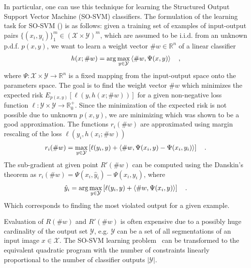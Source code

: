In particular, one can use this technique for learning the Structured Output Support Vector Machine (SO-SVM) classifiers. The formulation of the learning task for SO-SVM (\cite{Tsoch-StructOutput05}) is as follows: given a training set of examples of input-output pairs $\{ (x_i, y_i) \}_1^m \in (\mathcal{X} \times \mathcal{Y})^m$, which are assumed to be i.i.d. from an unknown p.d.f. $p(x, y)$, we want to learn a weight vector $\#w \in \mathbb{R}^n$ of a linear classifier
%
\begin{equation}
	h(x; \#w) = \arg\max_{y \in \mathcal{Y}} \left\langle \#w, \Psi(x, y)  \right\rangle \quad ,
\end{equation}
%
where $\Psi:\mathcal{X} \times \mathcal{Y} \rightarrow \mathbb{R}^n$ is a fixed mapping from the input-output space onto the parameters space. The goal is to find the weight vector $\#w$ which minimizes the expected risk $E_{p(x, y)}[\ell(y, h(x; \#w))]$ for a given non-negative loss function $\ell: \mathcal{Y} \times \mathcal{Y} \rightarrow \mathbb{R}_0^+$. Since the minimization of the expected risk is not possible due to unknown $p(x, y)$, we are minimizing  which was shown to be a good approximation. The functions $r_i(\#w)$ are approximated using margin rescaling of the loss $\ell(y_i, h(x_i; \#w))$
%
\begin{equation}
	r_i(\#w) = \max_{y \in \mathcal{Y}} \left[ \ell(y_i, y) + \langle \#w, \Psi(x_i, y) - \Psi(x_i, y_i)  \rangle  \right] \quad.
\end{equation}
%
The sub-gradient at given point $R'(\#w)$ can be computed using the Danskin's theorem as $r_i(\#w) = \Psi(x_i, \hat{y}_i) - \Psi(x_i, y_i)$, where
\begin{equation}
	\hat{y}_i = \arg\max_{y \in \mathcal{Y}} \left[ \ell(y_i, y) + \langle \#w, \Psi(x_i, y)  \rangle  \right]  \quad.
\end{equation}
%
Which corresponds to finding the most violated output for a given example.

Evaluation of $R(\#w)$ and $R'(\#w)$ is often expensive due to a possibly huge cardinality of the output set $\mathcal{Y}$, e.g. $\mathcal{Y}$ can be a set of all segmentations of an input image $x \in \mathcal{X}$. The SO-SVM learning problem~ can be transformed to the equivalent quadratic program with the number of constraints linearly proportional to the number of classifier outputs $|\mathcal{Y}|$.

